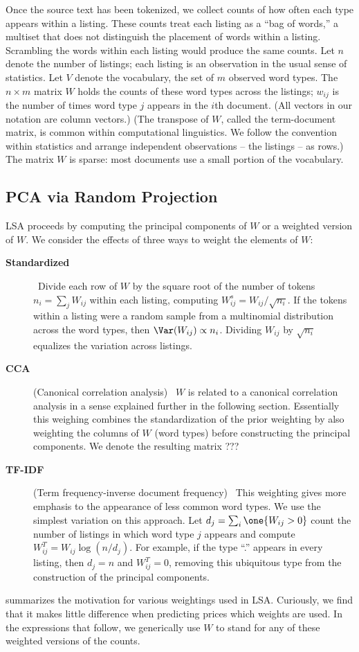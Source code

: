 \documentclass[10pt]{article}
\begin{document}
Once the source text has been tokenized, we collect counts of how often each type appears within a listing.  These counts treat each listing as a ``bag of words,'' a multiset that does not distinguish the placement of  words within a listing. Scrambling the words within each listing would produce the same counts.  Let $n$ denote the number of listings; each listing is an observation in the usual sense of statistics.  Let $V$ denote the vocabulary, the set of $m$ observed  word types.  The $n \times m$ matrix $W$ holds the counts of these word types across the listings; $w_{ij}$ is the number of times word type $j$ appears in the $i$th document.  (All vectors in our notation are column vectors.)    (The  transpose of $W$, called the term-document matrix, is common within computational linguistics. We follow the convention within statistics and arrange independent observations -- the listings -- as rows.)  The matrix $W$ is sparse: most documents use a small portion of the  vocabulary.   


 \subsection{ PCA  via Random Projection }  %

LSA proceeds by computing the principal components of $W$ or a weighted version of $W$.   We consider the effects of three ways to weight the elements of $W$:
\begin{description}
  \item[ {\bf Standardized} ] \ Divide each row of $W$ by the square root of the
 number of tokens $n_i = \sum_j W_{ij}$ within each listing, computing $W^s_{ij}
 = W_{ij}/\sqrt{n_i}$.  If the tokens within a listing were a random sample from
 a multinomial distribution across the word types, then $\Var(W_{ij}) \propto
 n_i$.  Dividing $W_{ij}$ by $\sqrt{n_i}$ equalizes the variation across
 listings.
   \item[ {\bf CCA}] (Canonical correlation analysis) \ $W$ is related to a
 canonical correlation analysis in a sense explained further in the following
 section.  Essentially this weighing combines the standardization of the prior
 weighting by also weighting the columns of $W$ (word types) before constructing
 the principal components.  We denote the resulting matrix ???
  \item [{\bf TF-IDF}] (Term frequency-inverse document frequency) \ This
 weighting gives more emphasis to the appearance of less common word types. We
 use the simplest variation on this approach.  Let $d_j = \sum _i\one{W_{ij} >
 0}$ count the number of listings in which word type $j$ appears and compute
 $W^{T}_{ij} = W_{ij} \log(n/d_j)$.  For example, if the type ``.'' appears in
 every listing, then $d_j = n$ and $W^{T}_{ij} = 0$, removing this ubiquitous
 type from the construction of the principal components.
\end{description}
 \citet{turney10} summarizes the motivation for various weightings used in LSA.
  Curiously, we find that it makes little difference when predicting prices
 which weights are used.  In the expressions that follow, we generically use $W$
 to stand for any of these weighted versions of the counts.
 
\end{document}
